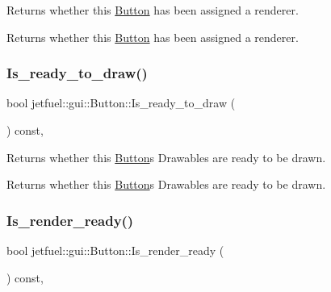 Returns whether this \hyperlink{classjetfuel_1_1gui_1_1Button}{Button} has been assigned a renderer. 

Returns whether this \hyperlink{classjetfuel_1_1gui_1_1Button}{Button} has been assigned a renderer. \mbox{\label{classjetfuel_1_1gui_1_1Button_a1572eec073adf699c280ffa784fa7459}} 
\subsubsection{\texorpdfstring{Is\+\_\+ready\+\_\+to\+\_\+draw()}{Is\_ready\_to\_draw()}}
{\footnotesize\ttfamily bool jetfuel\+::gui\+::\+Button\+::\+Is\+\_\+ready\+\_\+to\+\_\+draw (\begin{DoxyParamCaption}{ }\end{DoxyParamCaption}) const\hspace{0.3cm}{\ttfamily [inline]}, {\ttfamily [protected]}}



Returns whether this \hyperlink{classjetfuel_1_1gui_1_1Button}{Button}\textquotesingle{}s Drawables are ready to be drawn. 

Returns whether this \hyperlink{classjetfuel_1_1gui_1_1Button}{Button}\textquotesingle{}s Drawables are ready to be drawn. \mbox{\label{classjetfuel_1_1gui_1_1Button_ac6e616b98179911dd626b018e54b08d7}} 
\subsubsection{\texorpdfstring{Is\+\_\+render\+\_\+ready()}{Is\_render\_ready()}}
{\footnotesize\ttfamily bool jetfuel\+::gui\+::\+Button\+::\+Is\+\_\+render\+\_\+ready (\begin{DoxyParamCaption}{ }\end{DoxyParamCaption}) const\hspace{0.3cm}{\ttfamily [inline]}, {\ttfamily [protected]}}



